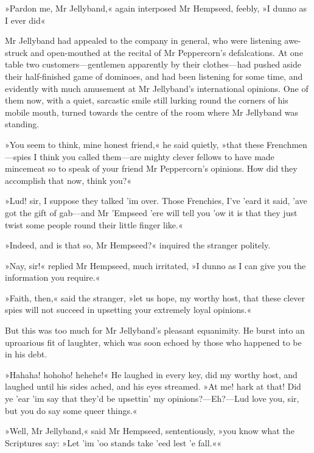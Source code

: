 »Pardon me, Mr Jellyband,« again interposed Mr Hempseed, feebly, »I dunno as I ever did\longdash«

Mr Jellyband had appealed to the company in general, who were listening awe-struck and open-mouthed at the recital of Mr Peppercorn's defalcations. At one table two customers\allowbreak---\allowbreak gentlemen apparently by their clothes\allowbreak---\allowbreak had pushed aside their half-finished game of dominoes, and had been listening for some time, and evidently with much amusement at Mr Jellyband's international opinions. One of them now, with a quiet, sarcastic smile still lurking round the corners of his mobile mouth, turned towards the centre of the room where Mr Jellyband was standing.

»You seem to think, mine honest friend,« he said quietly, »that these Frenchmen\allowbreak---\allowbreak spies I think you called them\allowbreak---\allowbreak are mighty clever fellows to have made mincemeat so to speak of your friend Mr Peppercorn's opinions. How did they accomplish that now, think you?«

»Lud! sir, I suppose they talked 'im over. Those Frenchies, I've 'eard it said, 'ave got the gift of gab\allowbreak---\allowbreak and Mr 'Empseed 'ere will tell you 'ow it is that they just twist some people round their little finger like.«

»Indeed, and is that so, Mr Hempseed?« inquired the stranger politely.

»Nay, sir!« replied Mr Hempseed, much irritated, »I dunno as I can give you the information you require.«

»Faith, then,« said the stranger, »let us hope, my worthy host, that these clever spies will not succeed in upsetting your extremely loyal opinions.«

But this was too much for Mr Jellyband's pleasant equanimity. He burst into an uproarious fit of laughter, which was soon echoed by those who happened to be in his debt.

»Hahaha! hohoho! hehehe!« He laughed in every key, did my worthy host, and laughed until his sides ached, and his eyes streamed. »At me! hark at that! Did ye 'ear 'im say that they'd be upsettin' my opinions?\allowbreak---\allowbreak Eh?\allowbreak---\allowbreak Lud love you, sir, but you do say some queer things.«

»Well, Mr Jellyband,« said Mr Hempseed, sententiously, »you know what the Scriptures say: »Let 'im 'oo stands take 'eed lest 'e fall.««

